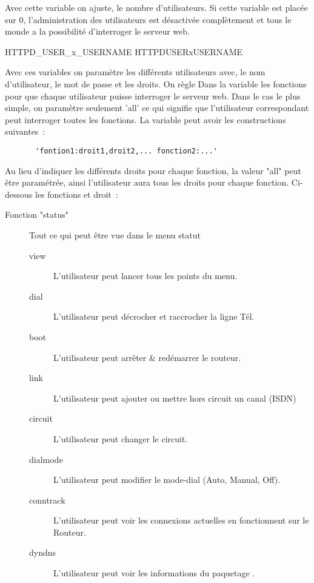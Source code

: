 \begin{description}

    {Avec cette variable on ajuste, le nombre d'utilisateurs. Si cette variable
    est placée sur 0, l'administration des utilisateurs est désactivée
    complètement et tous le monde a la possibilité d'interroger le serveur web.}

       {HTTPD\_USER\_x\_USERNAME}
       {HTTPDUSERxUSERNAME}

    {Avec ces variables on paramètre les différents utilisateurs avec, le nom
    d'utilisateur, le mot de passe et les droits. On règle Dans la variable
     les fonctions pour que chaque utilisateur puisse
    interroger le serveur web. Dans le cas le plus simple, on paramètre
    seulement 'all' ce qui signifie que l'utilisateur correspondant peut
    interroger toutes les fonctions. La variable peut avoir les constructions 
    suivantes~:

\begin{example}
\begin{verbatim}
       'fontion1:droit1,droit2,... fonction2:...'
\end{verbatim}
\end{example}

    Au lieu d'indiquer les différents droits pour chaque fonction, la valeur
    "all" peut être paramétrée, ainsi l'utilisateur aura tous les droits pour
    chaque fonction. Ci-dessous les fonctions et droit~:

      \begin{description}
      \item[Fonction "status"] Tout ce qui peut être vue dans le menu statut
        \begin{description}
        \item[view] L'utilisateur peut lancer tous les points du menu.
        \item[dial] L'utilisateur peut décrocher et raccrocher la ligne Tél.
        \item[boot] L'utilisateur peut arrêter \& redémarrer le routeur.
        \item[link] L'utilisateur peut ajouter ou mettre hors circuit un canal (ISDN)
        \item[circuit] L'utilisateur peut changer le circuit.
        \item[dialmode] L'utilisateur peut modifier le mode-dial (Auto, Manual, Off).
        \item[conntrack] L'utilisateur peut voir les connexions actuelles en
          fonctionnent sur le Routeur.
        \item[dyndns] L'utilisateur peut voir les informations du paquetage .
        \end{description}


\end{description}}
\end{description}
